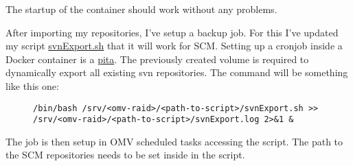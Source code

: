 

The startup of the container should work without any problems.


After importing my repositories, I've setup a backup job. For this I've updated
my script \href{https://github.com/ThirtySomething/NAS}{svnExport.sh} that it
will work for \gls{SCM}. Setting up a cronjob inside a \gls{Docker} container
is a \href{https://en.wiktionary.org/wiki/pain_in_the_ass}{pita}. The previously
created volume is required to dynamically export all existing \gls{svn}
repositories. The command will be something like this one:

\begin{figure}[H]
    \scriptsize
    \centering
    \begin{BVerbatim}
/bin/bash /srv/<omv-raid>/<path-to-script>/svnExport.sh >>
/srv/<omv-raid>/<path-to-script>/svnExport.log 2>&1 &
    \end{BVerbatim}
\end{figure}

The job is then setup in \gls{OMV} scheduled tasks accessing the script.
 The path to the \gls{SCM} repositories needs to be set
inside in the script.

